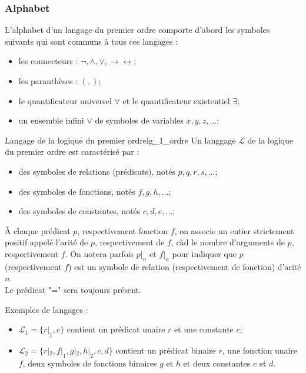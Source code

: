 \subsubsection{Alphabet}
\label{subsubsec:alphabet}
L'alphabet d'un langage du premier ordre comporte d'abord les symboles suivants qui sont communs à tous ces langages :
\begin{itemize}[label=\textbullet]
    \item les connecteurs : $\neg,\wedge,\vee,\rightarrow\leftrightarrow$;
    \item les paranthèses : $(,)$;
    \item le quantificateur universel $\forall$ et le quantificateur existentiel $\exists$;
    \item un ensemble infini $\vee$ de symboles de variables $x,y,z,\dots$;
\end{itemize}
\begin{definition}{Langage de la logique du premier ordre}{lg_1_ordre}
    Un langgage $\mathcal{L}$ de la logique du premier ordre est caractérisé par :
    \begin{itemize}[label=\textbullet]
        \item des symboles de relations (prédicats), notés $p,q,r,s,\dots$;
        \item des symboles de fonctions, notés $f,g,h,\dots$;
        \item des symboles de constantes, notés $c,d,e,\dots$;
    \end{itemize}
    À chaque prédicat $p$, respectivement fonction $f$, on associe un entier strictement positif appelé 
    l'arité de $p$, respectivement de $f$, càd le nombre d'arguments de $p$, respectivement $f$. On notera parfois $p|_n$ 
    et $f|_n$ pour indiquer que $p$ (respectivement $f$) est un symbole de relation (respectivement de fonction) d'arité $n$.\\
    Le prédicat "=" sera toujours présent.
\end{definition}
\begin{example}
    Exemples de langages :
    \begin{itemize}[label=\textbullet]
        \item $\mathcal{L}_1 = \{r|_1,c\}$ contient un prédicat unaire $r$ et une constante $c$;
        \item $\mathcal{L}_2 = \{r|_2,f|_1,g|_2,h|_2,c,d\}$ contient un prédicat binaire $r$, une fonction unaire $f$,
        deux symboles de fonctions binaires $g$ et $h$ et deux constantes $c$ et $d$.\\
    \end{itemize}
\end{example}

